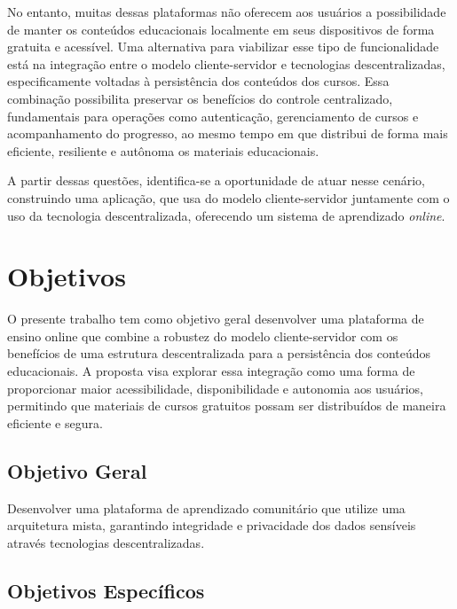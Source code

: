 No entanto, muitas dessas plataformas não oferecem aos usuários a possibilidade de manter os conteúdos educacionais localmente em seus dispositivos de forma gratuita e acessível. Uma alternativa para viabilizar esse tipo de funcionalidade está na integração entre o modelo cliente-servidor e tecnologias descentralizadas, especificamente voltadas à persistência dos conteúdos dos cursos. Essa combinação possibilita preservar os benefícios do controle centralizado, fundamentais para operações como autenticação, gerenciamento de cursos e acompanhamento do progresso, ao mesmo tempo em que distribui de forma mais eficiente, resiliente e autônoma os materiais educacionais.

A partir dessas questões, identifica-se a oportunidade de atuar nesse cenário, construindo uma aplicação, que usa do modelo cliente-servidor juntamente com o uso da tecnologia descentralizada, oferecendo um sistema de aprendizado \textit{online}.

\section{Objetivos}

O presente trabalho tem como objetivo geral desenvolver uma plataforma de ensino online que combine a robustez do modelo cliente-servidor com os benefícios de uma estrutura descentralizada para a persistência dos conteúdos educacionais. A proposta visa explorar essa integração como uma forma de proporcionar maior acessibilidade, disponibilidade e autonomia aos usuários, permitindo que materiais de cursos gratuitos possam ser distribuídos de maneira eficiente e segura.

\subsection{Objetivo Geral}

Desenvolver uma plataforma de aprendizado comunitário que utilize uma arquitetura mista, garantindo integridade e privacidade dos dados sensíveis através tecnologias descentralizadas.

\subsection{Objetivos Específicos}

